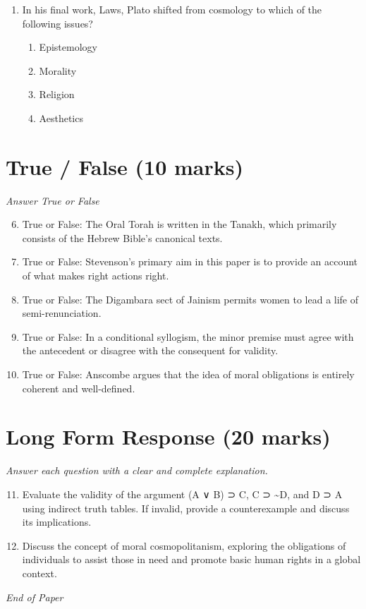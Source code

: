 \documentclass[12pt]{article}
\begin{document}
\begin{enumerate}[label=\arabic*.]
\begin{enumerate}[label=(\alph*)]
    \item justice
    \item fairness
    \item respect for other persons
    \item all of the above
\end{enumerate}
\item In his final work, Laws, Plato shifted from cosmology to which of the following issues?
\begin{enumerate}[label=(\alph*)]
    \item Epistemology
    \item Morality
    \item Religion
    \item Aesthetics
\end{enumerate}
\end{enumerate}

\section*{True / False (10 marks)}
\textit{Answer True or False}
\begin{enumerate}[label=\arabic*.]
\setcounter{enumi}{5}
\item True or False: The Oral Torah is written in the Tanakh, which primarily consists of the Hebrew Bible's canonical texts.
\item True or False: Stevenson's primary aim in this paper is to provide an account of what makes right actions right.
\item True or False: The Digambara sect of Jainism permits women to lead a life of semi-renunciation.
\item True or False: In a conditional syllogism, the minor premise must agree with the antecedent or disagree with the consequent for validity.
\item True or False: Anscombe argues that the idea of moral obligations is entirely coherent and well-defined.
\end{enumerate}

\section*{Long Form Response (20 marks)}
\textit{Answer each question with a clear and complete explanation.}
\begin{enumerate}[label=\arabic*.]
\setcounter{enumi}{10}
\item Evaluate the validity of the argument (A ∨ B) ⊃ C, C ⊃ \textasciitilde{}D, and D ⊃ A using indirect truth tables. If invalid, provide a counterexample and discuss its implications.
\item Discuss the concept of moral cosmopolitanism, exploring the obligations of individuals to assist those in need and promote basic human rights in a global context.
\end{enumerate}

\vfill
\noindent\textit{End of Paper}
\end{document}
